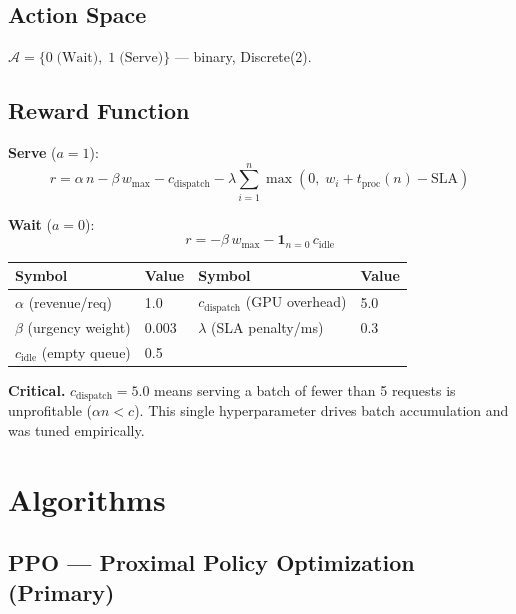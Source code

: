 \documentclass[11pt,a4paper]{article}
\begin{document}
\subsection{Action Space}

$\mathcal{A} = \{0\;\text{(Wait)},\;1\;\text{(Serve)}\}$ — binary, Discrete(2).

\subsection{Reward Function}

\textbf{Serve} ($a=1$):
\begin{equation}
  r = \alpha\,n - \beta\,w_\max - c_\text{dispatch} -
  \lambda \sum_{i=1}^{n} \max\!\left(0,\; w_i + t_\text{proc}(n) - \text{SLA}\right)
\end{equation}

\textbf{Wait} ($a=0$):
\begin{equation}
  r = -\beta\,w_\max - \mathbf{1}_{n=0}\,c_\text{idle}
\end{equation}

\medskip
\begin{tabular}{@{}llll@{}}
\toprule
\textbf{Symbol} & \textbf{Value} & \textbf{Symbol} & \textbf{Value} \\
\midrule
$\alpha$ (revenue/req) & 1.0 & $c_\text{dispatch}$ (GPU overhead) & 5.0 \\
$\beta$ (urgency weight) & 0.003 & $\lambda$ (SLA penalty/ms) & 0.3 \\
$c_\text{idle}$ (empty queue) & 0.5 & & \\
\bottomrule
\end{tabular}

\medskip
\begin{warnbox}
\textbf{Critical.} $c_\text{dispatch} = 5.0$ means serving a batch of fewer than
5 requests is unprofitable ($\alpha n < c$). This single hyperparameter drives
batch accumulation and was tuned empirically.
\end{warnbox}

\section{Algorithms}

\subsection{PPO — Proximal Policy Optimization (Primary)}
\end{document}
